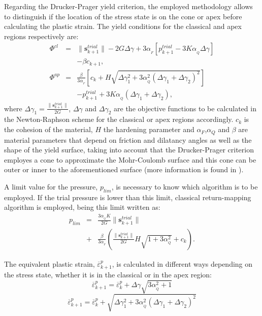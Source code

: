 \documentclass[twocolumn]{svjour3}          %
\begin{document}
Regarding the Drucker-Prager yield criterion, the employed methodology allows to distinguish if the location of the stress  state is on the cone or apex before calculating the plastic strain. The yield conditions for the classical and apex regions respectively are:
\begin{eqnarray}
\Phi^{cl} &=&\|\textbf{s}^{trial}_{k+1}\| - 2G\Delta\gamma + 3\alpha_{_F}[p^{trial}_{k+1}- 3K\alpha_{_Q}\Delta\gamma]
\nonumber\\\label{eq_dp9}
&&-\beta c_{k+1}, \\
\Phi^{ap}&=&\frac{\beta}{3\alpha_{_F}}\left[c_k+H\sqrt{\Delta\gamma_1^2 + 3\alpha_{_Q}^2(\Delta\gamma_1+\Delta\gamma_2)^2} \right]
\nonumber\\\label{eq_dp10}
&&- p^{trial}_{k+1}  
+3K\alpha_{_Q}\left(\Delta\gamma_1+\Delta\gamma_2 \right),
\end{eqnarray}
where $\Delta\gamma_1=\frac{\|\textbf{s}^{trial}_{k+1}\|}{2G}$, $\Delta\gamma$ and $\Delta\gamma_2$ are the objective functions to be calculated in the Newton-Raphson scheme for the classical or apex regions accordingly. $c_k$ is the cohesion of the material, $H$ the hardening parameter and $\alpha_F$,$\alpha_Q$ and $\beta$ are material parameters that depend on friction and dilatancy angles as well as the shape of the yield surface, taking into account that the Drucker-Prager criterion employes a cone to approximate the Mohr-Coulomb surface and this cone can be outer or inner to the aforementioned surface (more information is found in \cite{Navas:17b}).

A limit value for the pressure, $p_{lim}$, is necessary to know which algorithm is to be employed. If the trial pressure is lower than this limit, classical return-mapping algorithm is employed, being this limit written as:
 \begin{eqnarray}
p_{lim}&=&\frac{3\alpha_{_Q}K}{2G}\|\textbf{s}^{trial}_{k+1}\|\nonumber\\ \label{eq_dp8}
&+&\frac{\beta}{3\alpha_{_F}}\left( \frac{\|\textbf{s}^{trial}_{k+1}\|}{2G}H\sqrt{1+3\alpha_{_Q}^2} + c_k \right).
\end{eqnarray}


The equivalent plastic strain, $\overline{\varepsilon}^p_{k+1}$, is calculated in different ways depending on the stress state, whether it is in the classical or in the apex region:
$$
\overline{\varepsilon}^p_{k+1}=\overline{\varepsilon}^p_{k}+\Delta\gamma\sqrt{3\alpha_{_Q}^2+1}
$$
$$
\overline{\varepsilon}^p_{k+1}=\overline{\varepsilon}^p_{k}+\sqrt{\Delta\gamma_1^2+3\alpha_{_Q}^2\left(\Delta\gamma_1+\Delta\gamma_2 \right)^2}
$$
\end{document}
